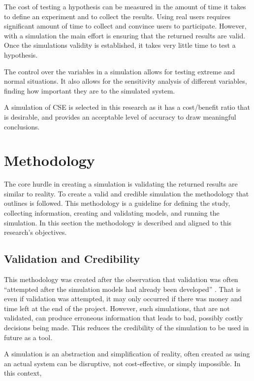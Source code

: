 The cost of testing a hypothesis can be measured in the amount of time it takes to define an experiment and to collect the results.
Using real users requires significant amount of time to collect and convince users to participate.
However, with a simulation the main effort is ensuring that the returned results are valid.
Once the simulations validity is established, it takes very little time to test a hypothesis.

The control over the variables in a simulation allows for testing extreme and normal situations.
It also allows for the sensitivity analysis of different variables, finding how important they are to the simulated system.

A simulation of CSE is selected in this research as it has a cost/benefit ratio that is desirable,
and provides an acceptable level of accuracy to draw meaningful conclusions.

\section{Methodology}
The core hurdle in creating a simulation is validating the returned results are similar to reality.
To create a valid and credible simulation the methodology that \citep{Law2005} outlines is followed.
This methodology is a guideline for defining the study, collecting information, creating and validating models, and running the simulation.
In this section the methodology is described and aligned to this research's objectives. 

\subsection{Validation and Credibility}
This methodology was created after the observation that validation was often ``attempted after the simulation models had already been developed'' \citep{Law2005}.
That is even if validation was attempted, it may only occurred if there was money and time left at the end of the project.
However, such simulations, that are not validated, can produce erroneous information that leads to bad, possibly costly decisions being made.
This reduces the credibility of the simulation to be used in future as a tool.

A simulation is an abstraction and simplification of reality, often created as using an actual system can be disruptive, not cost-effective, or simply impossible.
In this context,

